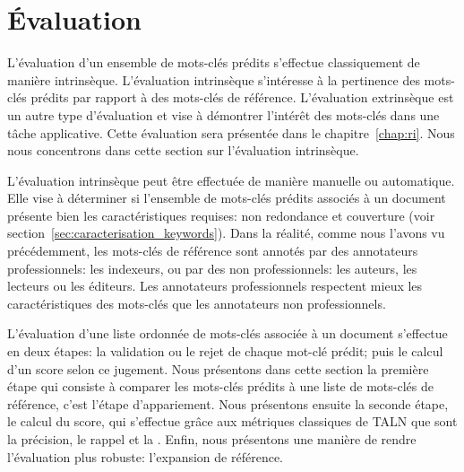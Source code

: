 \section{\'Evaluation}\label{sec:framework_evaluation}

L'évaluation d'un ensemble de mots-clés prédits s'effectue classiquement de manière intrinsèque.
L'évaluation intrinsèque s'intéresse à la pertinence des mots-clés prédits par rapport à des mots-clés de référence.
L'évaluation extrinsèque est un autre type d'évaluation et vise à démontrer l'intérêt des mots-clés dans une tâche applicative. Cette évaluation sera présentée dans le chapitre~\ref{chap:ri}. Nous nous concentrons dans cette section sur l'évaluation intrinsèque.

L'évaluation intrinsèque peut être effectuée de manière manuelle ou automatique. Elle vise à déterminer si l'ensemble de mots-clés prédits associés à un document présente bien les caractéristiques requises: non redondance et couverture (voir section~\ref{sec:caracterisation_keywords}).
Dans la réalité, comme nous l'avons vu précédemment, les mots-clés de référence sont annotés par des annotateurs professionnels: les indexeurs, ou par des non professionnels: les auteurs, les lecteurs ou les éditeurs.
Les annotateurs professionnels respectent mieux les caractéristiques des mots-clés que les annotateurs non professionnels.

L'évaluation d'une liste ordonnée de mots-clés associée à un document s'effectue en deux étapes: la validation ou le rejet de chaque mot-clé prédit; puis le calcul d'un score selon ce jugement.
Nous présentons dans cette section la première étape qui consiste à comparer les mots-clés prédits à une liste de mots-clés de référence, c'est l'étape d'appariement.
Nous présentons ensuite la seconde étape, le calcul du score, qui s'effectue grâce aux métriques classiques de TALN que sont la précision, le rappel et la \fmesure{}.
Enfin, nous présentons une manière de rendre l'évaluation plus robuste: l'expansion de référence.


